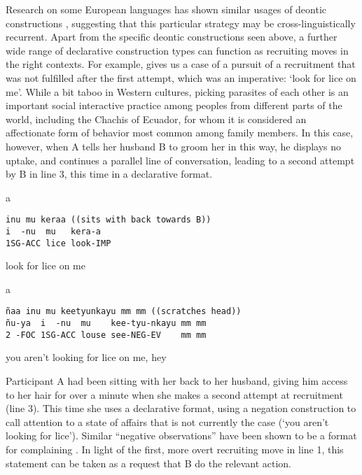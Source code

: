\documentclass[output=paper]{langsci/langscibook}
\begin{document}
Research on some European languages has shown similar usages of deontic constructions \citep{ZinkenOgiermann2011,Couper-KuhlenEtelämäki2015,RossiZinken2016}, suggesting that this particular strategy may be cross-lin\-guis\-tically recurrent. Apart from the specific deontic constructions seen above, a further wide range of declarative construction types can function as recruiting moves in the right contexts. For example,  gives us a case of a pursuit of a recruitment that was not fulfilled after the first attempt, which was an imperative: ‘look for lice on me’. While a bit taboo in Western cultures, picking parasites of each other is an important social interactive practice among peoples from different parts of the world, including the Chachis of Ecuador, for whom it is considered an affectionate form of behavior most common among family members. In this case, however, when A tells her husband B to groom her in this way, he displays no uptake, and continues a parallel line of conversation, leading to a second attempt by B in line 3, this time in a declarative format.

\vspace{-1mm}
%
\begin{mdframednoverticalspace}[style=firstfoc]
\begin{transbox}{1}{a}
\begin{verbatim}
inu mu keraa ((sits with back towards B))
i  -nu  mu   kera-a
1SG-ACC lice look-IMP
\end{verbatim}
look for lice on me
\end{transbox}
\end{mdframednoverticalspace}
%
%
\begin{mdframednoverticalspace}[style=firstfoc]
\begin{transbox}{3}{a}
\begin{verbatim}
ñaa inu mu keetyunkayu mm mm ((scratches head))
ñu-ya  i  -nu  mu    kee-tyu-nkayu mm mm
2 -FOC 1SG-ACC louse see-NEG-EV    mm mm
\end{verbatim}
you aren't looking for lice on me, hey
\end{transbox}
\end{mdframednoverticalspace}
%

\normalsize
Participant A had been sitting with her back to her husband, giving him access to her hair for over a minute when she makes a second attempt at recruitment (line 3). This time she uses a declarative format, using a negation construction to call attention to a state of affairs that is not currently the case (‘you aren’t looking for lice’). Similar “negative observations” have been shown to be a format for complaining \citep{Schegloff1988,Rossi2018}. In light of the first, more overt recruiting move in line 1, this statement can be taken as a request that B do the relevant action.
\end{document}
